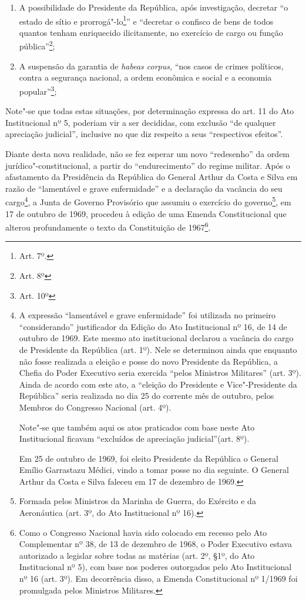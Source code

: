 \begin{enumerate}
\item{}A possibilidade do Presidente da República, após investigação,
decretar ``o estado de sítio e prorrogá"-lo\footnote{Art. 7º.}'' e
``decretar o confisco de bens de todos quantos tenham enriquecido
ilicitamente, no exercício de cargo ou função pública''\footnote{Art.
  8º};

\item{}A suspensão da garantia de \emph{habeas corpus,} ``nos casos de
crimes políticos, contra a segurança nacional, a ordem econômica e
social e a economia popular''\footnote{Art. 10º};
\end{enumerate}

Note"-se que todas estas situações, por determinação expressa do art. 11
do Ato Institucional nº 5, poderiam vir a ser decididas, com
exclusão ``de qualquer apreciação judicial'', inclusive no que
diz respeito a seus ``respectivos efeitos''.

Diante desta nova realidade, não se fez esperar um novo ``redesenho'' da
ordem jurídico"-constitucional, a partir do ``endurecimento'' do regime
militar. Após o afastamento da Presidência da República do General
Arthur da Costa e Silva em razão de ``lamentável e grave
enfermidade'' e a declaração da vacância do seu cargo\footnote{A
  expressão ``lamentável e grave enfermidade'' foi utilizada no
  primeiro ``considerando'' justificador da Edição do Ato Institucional
  nº 16, de 14 de outubro de 1969. Este mesmo ato institucional declarou
  a vacância do cargo de Presidente da República (art. 1º). Nele se
  determinou ainda que enquanto não fosse realizada a eleição e posse do
  novo Presidente da República, a Chefia do Poder Executivo seria
  exercida ``pelos Ministros Militares'' (art. 3º). Ainda de
  acordo com este ato, a ``eleição do Presidente e Vice"-Presidente
  da República'' seria realizada no dia 25 do corrente mês de outubro,
  pelos Membros do Congresso Nacional (art. 4º).

  Note"-se que também aqui os atos praticados com base neste Ato
  Institucional ficavam ``excluídos de apreciação judicial''(art.
  8º).

  Em 25 de outubro de 1969, foi eleito Presidente da República o General
  Emílio Garrastazu Médici, vindo a tomar posse no dia seguinte. O
  General Arthur da Costa e Silva faleceu em 17 de dezembro de 1969.}, a
Junta de Governo Provisório que assumiu o exercício do governo\footnote{Formada
  pelos Ministros da Marinha de Guerra, do Exército e da Aeronáutica
  (art. 3º, do Ato Institucional nº 16).}, em 17 de outubro de 1969,
procedeu à edição de uma Emenda Constitucional que alterou profundamente
o texto da Constituição de 1967\footnote{Como o Congresso Nacional havia
  sido colocado em recesso pelo Ato Complementar nº 38, de 13 de
  dezembro de 1968, o Poder Executivo estava autorizado a legislar sobre
  todas as matérias (art. 2º, §1º, do Ato Institucional nº 5), com base
  nos poderes outorgados pelo Ato Institucional nº 16 (art. 3º). Em
  decorrência disso, a Emenda Constitucional nº 1/1969 foi promulgada
  pelos Ministros Militares.}.

